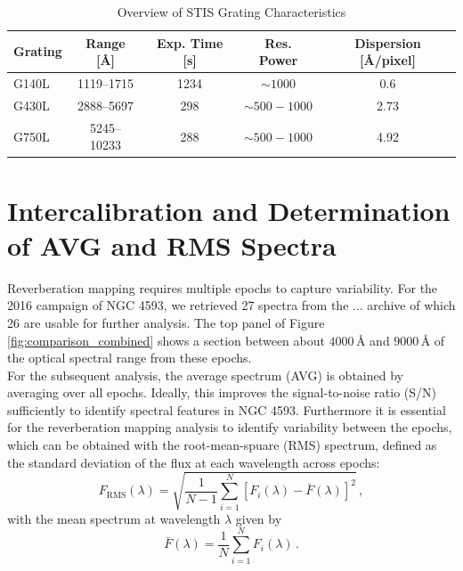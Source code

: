 \begin{table}[h!]
	\centering
	\small
	\caption{Overview of STIS Grating Characteristics \parencite{stisgratings}}
	\label{tab:stis_gratings}
	\begin{tabular}{lcccc}
		\hline
		\textbf{Grating} & \textbf{Range [\AA]} & \textbf{Exp. Time [s]} & \textbf{Res. Power} & \textbf{Dispersion [\AA/pixel]} \\
		\hline
		G140L  & 1119--1715  & 1234 & $\sim 1000$         & 0.6 \\
		G430L  & 2888--5697  & 298  & $\sim 500 - 1000$    & 2.73 \\
		G750L  & 5245--10233 & 288  & $\sim 500 - 1000$    & 4.92 \\
		\hline
	\end{tabular}
\end{table}




\section{Intercalibration and Determination of AVG and RMS Spectra}

Reverberation mapping requires multiple epochs to capture variability. For the 2016 campaign of NGC 4593, we retrieved 27 spectra from the ... archive of which 26 are usable for further analysis. The top panel of Figure \ref{fig:comparison_combined} shows a section between about $4000\,\text{\AA}$ and $9000\,\text{\AA}$ of the optical spectral range from these epochs.\\
For the subsequent analysis, the average spectrum (AVG) is obtained by averaging over all epochs. Ideally, this improves the signal-to-noise ratio (S/N) sufficiently to identify spectral features in NGC 4593.  Furthermore it is essential for the reverberation mapping analysis to identify variability between the epochs, which can be obtained with the root-mean-spuare (RMS) spectrum, defined as the standard deviation of the flux at each wavelength across epochs:
\begin{equation}
	F_{\mathrm{RMS}}(\lambda) = \sqrt{\frac{1}{N-1}\sum_{i=1}^{N}\left[F_i(\lambda)-\bar{F}(\lambda)\right]^2}\,,
\end{equation}
with the mean spectrum at wavelength $\lambda$ given by
\begin{equation}
	\bar{F}(\lambda) = \frac{1}{N}\sum_{i=1}^{N} F_i(\lambda)\,.
\end{equation}

